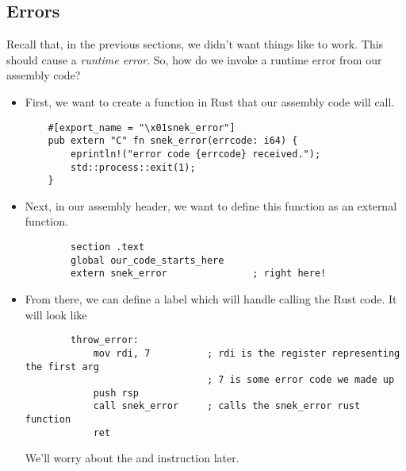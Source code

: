 \documentclass[letterpaper]{article}
\begin{document}
\subsection{Errors}
Recall that, in the previous sections, we didn't want things like  to work. This should cause a \emph{runtime error}. So, how do we invoke a runtime error from our assembly code? 
\begin{itemize}
    \item First, we want to create a function in Rust that our assembly code will call. 
    \begin{verbatim}
    #[export_name = "\x01snek_error"]
    pub extern "C" fn snek_error(errcode: i64) {
        eprintln!("error code {errcode} received.");
        std::process::exit(1);
    }\end{verbatim}
    
    \item Next, in our assembly header, we want to define this function as an external function. 
    \begin{verbatim}
        section .text 
        global our_code_starts_here 
        extern snek_error               ; right here!\end{verbatim}

    \item From there, we can define a  label which will handle calling the Rust code. It will look like 
    \begin{verbatim}
        throw_error: 
            mov rdi, 7          ; rdi is the register representing the first arg 
                                ; 7 is some error code we made up 
            push rsp    
            call snek_error     ; calls the snek_error rust function 
            ret \end{verbatim}
    We'll worry about the  and  instruction later. 
\end{itemize}
\end{document}
